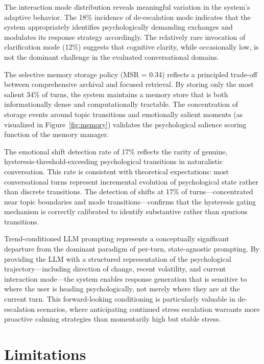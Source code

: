 \documentclass[conference]{IEEEtran}
\begin{document}
The interaction mode distribution reveals meaningful variation in the system's adaptive behavior. The 18\% incidence of de-escalation mode indicates that the system appropriately identifies psychologically demanding exchanges and modulates its response strategy accordingly. The relatively rare invocation of clarification mode (12\%) suggests that cognitive clarity, while occasionally low, is not the dominant challenge in the evaluated conversational domains.

The selective memory storage policy (MSR = 0.34) reflects a principled trade-off between comprehensive archival and focused retrieval. By storing only the most salient 34\% of turns, the system maintains a memory store that is both informationally dense and computationally tractable. The concentration of storage events around topic transitions and emotionally salient moments (as visualized in Figure~\ref{fig:memory}) validates the psychological salience scoring function of the memory manager.

The emotional shift detection rate of 17\% reflects the rarity of genuine, hysteresis-threshold-exceeding psychological transitions in naturalistic conversation. This rate is consistent with theoretical expectations: most conversational turns represent incremental evolution of psychological state rather than discrete transitions. The detection of shifts at 17\% of turns---concentrated near topic boundaries and mode transitions---confirms that the hysteresis gating mechanism is correctly calibrated to identify substantive rather than spurious transitions.

Trend-conditioned LLM prompting represents a conceptually significant departure from the dominant paradigm of per-turn, state-agnostic prompting. By providing the LLM with a structured representation of the psychological trajectory---including direction of change, recent volatility, and current interaction mode---the system enables response generation that is sensitive to where the user is heading psychologically, not merely where they are at the current turn. This forward-looking conditioning is particularly valuable in de-escalation scenarios, where anticipating continued stress escalation warrants more proactive calming strategies than momentarily high but stable stress.

\section{Limitations}
\label{sec:limitations}
\end{document}
